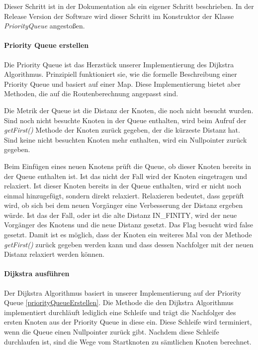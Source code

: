 \documentclass[12pt, a4paper, ngerman]{article}
\begin{document}
Dieser Schritt ist in der Dokumentation als ein eigener Schritt beschrieben. In der Release Version der Software wird dieser Schritt im Konstruktor der Klasse \textit{PriorityQueue} angestoßen.

\paragraph{Priority Queue erstellen \label{priorityQueueErstellen}}
Die Priority Queue ist das Herzstück unserer Implementierung des Dijkstra Algorithmus. Prinzipiell funktioniert sie, wie die formelle Beschreibung einer Priority Queue und basiert auf einer Map. Diese Implementierung bietet aber Methoden, die auf die Routenberechnung angepasst sind. 

Die Metrik der Queue ist die Distanz der Knoten, die noch nicht besucht wurden. Sind noch nicht besuchte Knoten in der Queue enthalten, wird beim Aufruf der \textit{getFirst()} Methode der Knoten zurück gegeben, der die kürzeste Distanz hat. Sind keine nicht besuchten Knoten mehr enthalten, wird ein Nullpointer zurück gegeben.

Beim Einfügen eines neuen Knotens prüft die Queue, ob dieser Knoten bereits in der Queue enthalten ist. Ist das nicht der Fall wird der Knoten eingetragen und relaxiert. Ist dieser Knoten bereits in der Queue enthalten, wird er nicht noch einmal hinzugefügt, sondern direkt relaxiert. Relaxieren bedeutet, dass geprüft wird, ob sich bei dem neuen Vorgänger eine Verbesserung der Distanz ergeben würde. Ist das der Fall, oder ist die alte Distanz IN\_FINITY, wird der neue Vorgänger des Knotens und die neue Distanz gesetzt. Das Flag besucht wird false gesetzt. Damit ist es möglich, dass der Knoten ein weiteres Mal von der Methode \textit{getFirst()} zurück gegeben werden kann und dass dessen Nachfolger mit der neuen Distanz relaxiert werden können.


\paragraph{Dijkstra ausführen}
Der Dijkstra Algorithmus basiert in unserer Implementierung auf der Priority Queue \ref{priorityQueueErstellen}. Die Methode die den Dijkstra Algorithmus implementiert durchläuft lediglich eine Schleife und trägt die Nachfolger des ersten Knoten aus der Priority Queue in diese ein. Diese Schleife wird terminiert, wenn die Queue einen Nullpointer zurück gibt. Nachdem diese Schleife durchlaufen ist, sind die Wege vom Startknoten zu sämtlichen Knoten berechnet.
\end{document}
